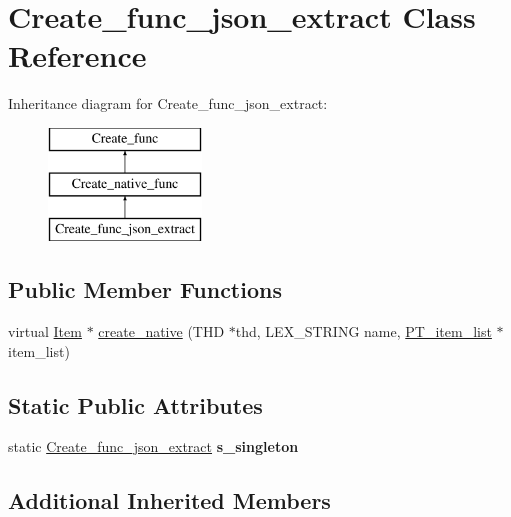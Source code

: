 \hypertarget{classCreate__func__json__extract}{}\section{Create\+\_\+func\+\_\+json\+\_\+extract Class Reference}
\label{classCreate__func__json__extract}
Inheritance diagram for Create\+\_\+func\+\_\+json\+\_\+extract\+:\begin{figure}[H]
\begin{center}
\leavevmode
\includegraphics[height=3.000000cm]{classCreate__func__json__extract}
\end{center}
\end{figure}
\subsection*{Public Member Functions}
\begin{DoxyCompactItemize}
\item 
virtual \mbox{\hyperlink{classItem}{Item}} $\ast$ \mbox{\hyperlink{classCreate__func__json__extract_a5df6886f28b355be27a3b36d07c91458}{create\+\_\+native}} (T\+HD $\ast$thd, L\+E\+X\+\_\+\+S\+T\+R\+I\+NG name, \mbox{\hyperlink{classPT__item__list}{P\+T\+\_\+item\+\_\+list}} $\ast$item\+\_\+list)
\end{DoxyCompactItemize}
\subsection*{Static Public Attributes}
\begin{DoxyCompactItemize}
\item 
\mbox{\label{classCreate__func__json__extract_ab07e0b675a3fc27637725533334850fa}} 
static \mbox{\hyperlink{classCreate__func__json__extract}{Create\+\_\+func\+\_\+json\+\_\+extract}} {\bfseries s\+\_\+singleton}
\end{DoxyCompactItemize}
\subsection*{Additional Inherited Members}


